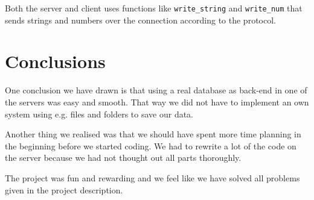 \documentclass[12pt]{article}
\begin{document}
Both the server and client uses functions like \verb!write_string! and \verb!write_num! that sends strings and numbers over the connection according to the protocol.


\section{Conclusions}
One conclusion we have drawn is that using a real database as back-end in one of the servers was easy and smooth. That way we did not have to implement an own system using e.g. files and folders to save our data.

Another thing we realised was that we should have spent more time planning in the beginning before we started coding. We had to rewrite a lot of the code on the server because we had not thought out all parts thoroughly. 

The project was fun and rewarding and we feel like we have solved all problems given in the project description.
\end{document}

